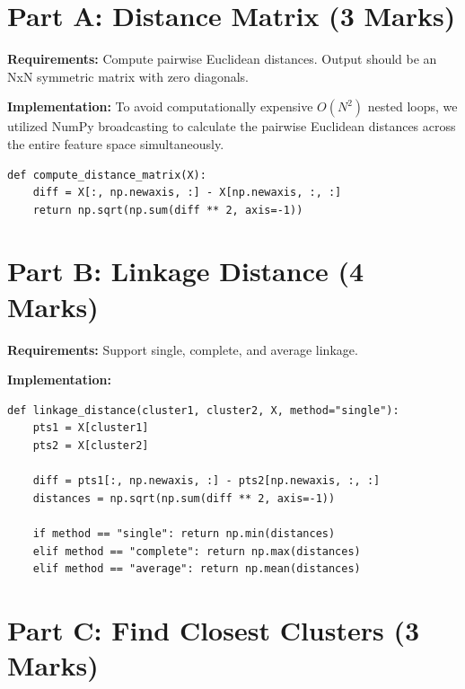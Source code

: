 \documentclass[12pt,a4paper]{article}
\begin{document}

\section{Part A: Distance Matrix (3 Marks)}

\begin{tcolorbox}
\textbf{Requirements:} Compute pairwise Euclidean distances. Output should be an NxN symmetric matrix with zero diagonals.
\end{tcolorbox}

\textbf{Implementation:}
To avoid computationally expensive $O(N^2)$ nested loops, we utilized NumPy broadcasting to calculate the pairwise Euclidean distances across the entire feature space simultaneously.
\begin{lstlisting}
def compute_distance_matrix(X):
    diff = X[:, np.newaxis, :] - X[np.newaxis, :, :]
    return np.sqrt(np.sum(diff ** 2, axis=-1))
\end{lstlisting}


\section{Part B: Linkage Distance (4 Marks)}

\begin{tcolorbox}
\textbf{Requirements:} Support single, complete, and average linkage.
\end{tcolorbox}

\textbf{Implementation:}
\begin{lstlisting}
def linkage_distance(cluster1, cluster2, X, method="single"):
    pts1 = X[cluster1]
    pts2 = X[cluster2]
    
    diff = pts1[:, np.newaxis, :] - pts2[np.newaxis, :, :]
    distances = np.sqrt(np.sum(diff ** 2, axis=-1))

    if method == "single": return np.min(distances)
    elif method == "complete": return np.max(distances)
    elif method == "average": return np.mean(distances)
\end{lstlisting}


\section{Part C: Find Closest Clusters (3 Marks)}
\end{document}
